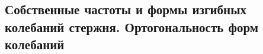 

\subsection{Собственные частоты и формы изгибных колебаний стержня. Ортогональность форм колебаний}



